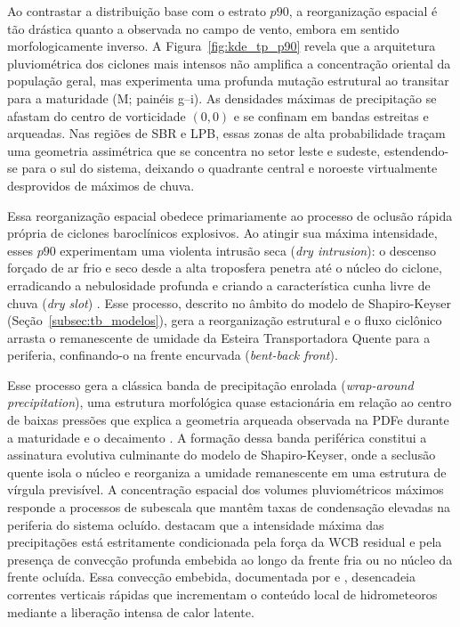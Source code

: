 Ao contrastar a distribuição base com o estrato $p90$, a reorganização espacial é tão drástica quanto a observada no campo de vento, embora em sentido morfologicamente inverso.
A Figura~\ref{fig:kde_tp_p90} revela que a arquitetura pluviométrica dos ciclones mais intensos não amplifica a concentração oriental da população geral, mas experimenta uma profunda mutação estrutural ao transitar para a maturidade (M; painéis g--i).
As densidades máximas de precipitação se afastam do centro de vorticidade $(0,0)$ e se confinam em bandas estreitas e arqueadas.
Nas regiões de SBR e LPB, essas zonas de alta probabilidade traçam uma geometria assimétrica que se concentra no setor leste e sudeste, estendendo-se para o sul do sistema, deixando o quadrante central e noroeste virtualmente desprovidos de máximos de chuva.

Essa reorganização espacial obedece primariamente ao processo de oclusão rápida própria de ciclones baroclínicos explosivos.
Ao atingir sua máxima intensidade, esses $p90$ experimentam uma violenta intrusão seca (\textit{dry intrusion}): o descenso forçado de ar frio e seco desde a alta troposfera penetra até o núcleo do ciclone, erradicando a nebulosidade profunda e criando a característica cunha livre de chuva (\textit{dry slot}) \citep{shapiro1999bridge}. Esse processo, descrito no âmbito do modelo de Shapiro-Keyser (Seção~\ref{subsec:tb_modelos}), gera a reorganização estrutural e o fluxo ciclônico arrasta o remanescente de umidade da Esteira Transportadora Quente para a periferia, confinando-o na frente encurvada (\textit{bent-back front}).

Esse processo gera a clássica banda de precipitação enrolada (\textit{wrap-around precipitation}), uma estrutura morfológica quase estacionária em relação ao centro de baixas pressões que explica a geometria arqueada observada na PDFe durante a maturidade e o decaimento \citep{schultz2021antecedents}.
A formação dessa banda periférica constitui a assinatura evolutiva culminante do modelo de Shapiro-Keyser, onde a seclusão quente isola o núcleo e reorganiza a umidade remanescente em uma estrutura de vírgula previsível.
A concentração espacial dos volumes pluviométricos máximos responde a processos de subescala que mantêm taxas de condensação elevadas na periferia do sistema ocluído. \citet{priestley2022improved} destacam que a intensidade máxima das precipitações está estritamente condicionada pela força da WCB residual e pela presença de convecção profunda embebida ao longo da frente fria ou no núcleo da frente ocluída.
Essa convecção embebida, documentada por \citet{oertel2021warm} e \citet{blanchard2021warm}, desencadeia correntes verticais rápidas que incrementam o conteúdo local de hidrometeoros mediante a liberação intensa de calor latente.

